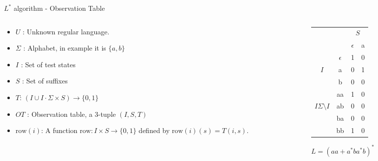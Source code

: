 \documentclass{beamer}
\begin{document}
\begin{frame}{$L^*$ algorithm - Observation Table }
    \begin{columns}[T]
        \begin{column}{0.6\textwidth}
            \begin{itemize}
                \item $U$ : Unknown regular language. 
                \item $\Sigma$ : Alphabet, in example it is $\{a,b\}$
                \item $I$ : Set of test states
                \item $S$ : Set of suffixes
                \item $T$: $(I \cup I \cdot \Sigma \times S) \to \{0,1\}$
                \item $OT$ : {\small Observation table, a 3-tuple } $(I,S,T)$
                \item $\text{row}(i)$: A function $\text{row} \colon I \times S \to \{0,1\}$ defined by
                $\text{row}(i)(s) = T(i,s)$.
            \end{itemize}
        \end{column}

        \begin{column}{0.6\textwidth}
            \centering
            \begin{tabular}{cc|c|c}
                &   & \multicolumn{2}{c}{$S$} \\ 
                \multicolumn{2}{c|}{} & $\epsilon$ & a \\ \hline
                & $\epsilon$ & 1 & 0 \\
                {$I$}& a          & 0 & 1 \\
                & b          & 0 & 0 \\\hline
                & aa& 1& 0 \\
                {$I\Sigma\setminus I$}        & ab& 0&0\\
                & ba         & 0 & 0 \\
                & bb         & 1 & 0 \\ 
            \end{tabular}
            \par \vspace{0.2cm} 
            {\footnotesize $L = (aa + a^* b a^* b)^*$}
        \end{column}
    \end{columns}
\end{frame}
\end{document}
